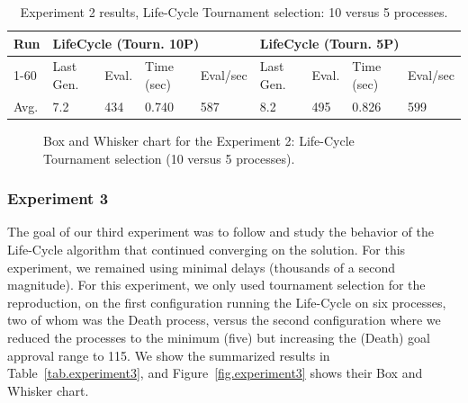 \documentclass[graybox]{svmult}
\begin{document}
\begin{table}[]
    \centering        
    \caption{Experiment 2 results, Life-Cycle Tournament selection: 10 versus 5 processes.}\label{tab.experiment2}
    \begin{tabular}{|l|l|l|l|l|l|l|l|l|}
    \hline
    Run & \multicolumn{4}{l|}{LifeCycle (Tourn. 10P)} & \multicolumn{4}{l|}{LifeCycle (Tourn. 5P)} \\ \hline
    1-60 & Last Gen. & Eval. & Time (sec) & Eval/sec & Last Gen. & Eval. & Time (sec) & Eval/sec \\ \hline
    Avg. & 7.2 & 434 & 0.740 & 587 & 8.2 & 495 & 0.826 & 599 \\ \hline
    \end{tabular}
    \end{table}

\begin{figure}
    \caption{Box and Whisker chart for the Experiment 2: Life-Cycle Tournament selection (10 versus 5 processes).} \label{fig.experiment2}
    \end{figure}


\subsubsection{Experiment 3} The goal of our third experiment was to follow and
study the behavior of the Life-Cycle algorithm that continued converging on the
solution. For this experiment, we remained using minimal delays (thousands of a
second magnitude). For this experiment, we only used tournament selection for
the reproduction, on the first configuration running the Life-Cycle on six
processes, two of whom was the Death process, versus the second configuration
where we reduced the processes to the minimum (five) but increasing the (Death)
goal approval range to 115. We show the summarized results in
Table~\ref{tab.experiment3}, and Figure~\ref{fig.experiment3} shows their Box
and Whisker chart.
\end{document}

